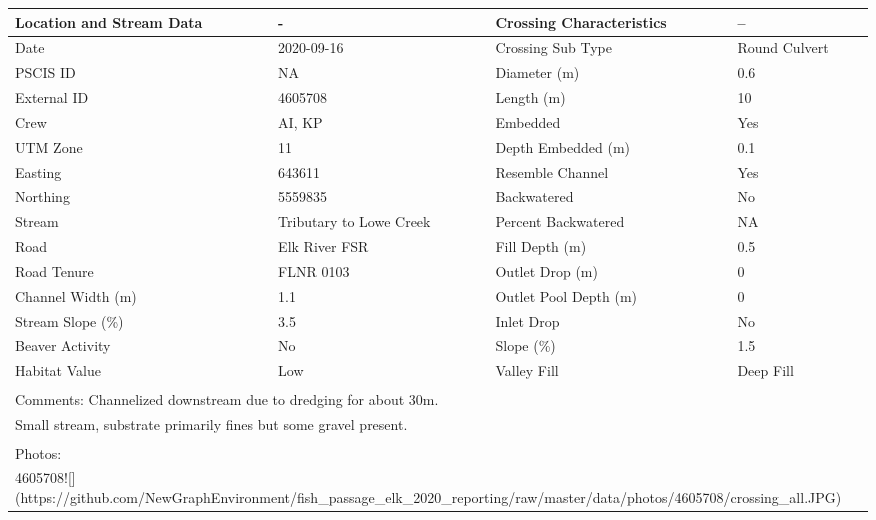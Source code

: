 \documentclass[
]{book}
\begin{document}
\begin{tabular}{l|l|l|l}
\hline
Location and Stream Data & - & Crossing Characteristics & --\\
\hline
Date & 2020-09-16 & Crossing Sub Type & Round Culvert\\
\hline
PSCIS ID & NA & Diameter (m) & 0.6\\
\hline
External ID & 4605708 & Length (m) & 10\\
\hline
Crew & AI, KP & Embedded & Yes\\
\hline
UTM Zone & 11 & Depth Embedded (m) & 0.1\\
\hline
Easting & 643611 & Resemble Channel & Yes\\
\hline
Northing & 5559835 & Backwatered & No\\
\hline
Stream & Tributary to Lowe Creek & Percent Backwatered & NA\\
\hline
Road & Elk River FSR & Fill Depth (m) & 0.5\\
\hline
Road Tenure & FLNR 0103 & Outlet Drop (m) & 0\\
\hline
Channel Width (m) & 1.1 & Outlet Pool Depth (m) & 0\\
\hline
Stream Slope (\%) & 3.5 & Inlet Drop & No\\
\hline
Beaver Activity & No & Slope (\%) & 1.5\\
\hline
Habitat Value & Low & Valley Fill & Deep Fill\\
\hline
\multicolumn{4}{l}{\textsuperscript{} Comments: Channelized downstream due to dredging for about 30m.}\\
\multicolumn{4}{l}{Small stream, substrate primarily fines but some gravel present.}\\
\multicolumn{4}{l}{\textsuperscript{} Photos:}\\
\multicolumn{4}{l}{4605708![](https://github.com/NewGraphEnvironment/fish\_passage\_elk\_2020\_reporting/raw/master/data/photos/4605708/crossing\_all.JPG)}\\
\end{tabular}
\end{document}
